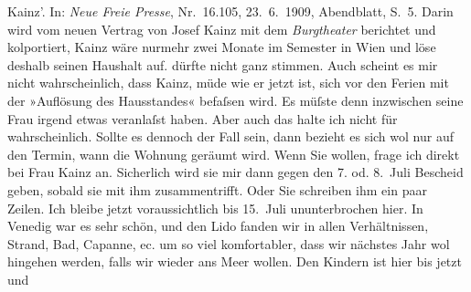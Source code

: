 \begin{ledgroupsized}[t]{13cm}
{{{{                        Kainz’}. In: \emph{Neue Freie Presse},
                     Nr. 16.105, 23. 6. 1909, Abendblatt, S. 5. Darin wird vom
                  neuen Vertrag von Josef Kainz mit dem \emph{Burgtheater} berichtet und kolportiert, Kainz wäre nurmehr zwei Monate im Semester
                  in Wien und löse deshalb seinen Haushalt
                  auf.}}}\label{K_L03501-1h} dürfte nicht ganz stimmen. Auch scheint es mir nicht wahrscheinlich,
               dass Kainz, müde wie er jetzt ist, sich vor
               den Ferien mit der »Auflösung des Hausstandes« befaſsen wird. Es müſste denn
               inzwischen seine Frau irgend
               etwas veranlaſst haben. Aber auch das halte ich nicht für wahrscheinlich. Sollte es
               dennoch der Fall sein, dann bezieht es sich wol nur auf den Termin, wann die Wohnung
               geräumt wird. Wenn Sie wollen, frage ich direkt bei Frau Kainz an. Sicherlich wird sie mir dann gegen den 7. od.
               8. Juli Bescheid geben, sobald sie mit ihm zusammentrifft. Oder Sie schreiben ihm ein
               paar Zeilen. Ich bleibe jetzt voraussichtlich bis 15. Juli ununterbrochen hier. In
                  Venedig war es sehr schön, und den Lido fanden wir in allen Verhältnissen, Strand,
               Bad, Capanne, ec. um so viel komfortabler, dass wir nächstes Jahr wol hingehen
               werden, falls wir wieder ans Meer wollen. Den Kindern ist hier bis jetzt und

\end{ledgroupsized}
